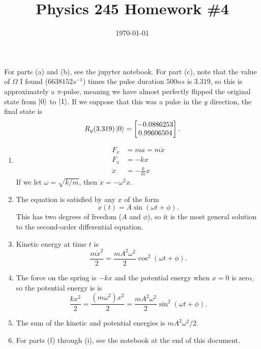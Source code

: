 \documentclass{article}
\date{\today}
\title{Physics 245 Homework \#4}
\begin{document}
\maketitle

\begin{prob}
\end{prob}
For parts (a) and (b), see the jupyter notebook. For part (c), note that the value of $\Omega$ I found ($6638152 s^{-1}$) times the pulse duration $500 ns$ is $3.319$, so this is approximately a $\pi$-pulse, meaning we have almost perfectly flipped the original state from $\left\lvert 0 \right\rangle$ to $\left\lvert 1 \right\rangle$. If we suppose that this was a pulse in the $y$ direction, the final state is
\[ R_y(3.319) \left\lvert 0 \right\rangle = \begin{bmatrix}
    -0.0886253 \\
    0.99606504
\end{bmatrix}. \]

\begin{prob}
\end{prob}
\begin{enumerate}[label=(\alph*)]
    \item \begin{align*}
            F_x &= ma = m \ddot{x} \\
            F_x &= -kx \\
            \ddot{x} &= - \frac{k}{m} x
    \end{align*}
    If we let $\omega = \sqrt{k/m}$, then $\ddot{x}=-\omega^2 x$.
\item The equation is satisfied by any $x$ of the form
    \[ x(t) = A \sin \left( \omega t + \phi \right). \]
    This has two degrees of freedom ($A$ and $\phi$), so it is the most general solution to the second-order differential equation.
\item Kinetic energy at time $t$ is
    \[ \frac{m\dot{x}^2}{2} = \frac{mA^2\omega^2}{2} \cos^2 \left( \omega t + \phi \right). \]
\item The force on the spring is $-kx$ and the potential energy when $x=0$ is zero, so the potential energy is is
    \[ \frac{kx^2}{2} = \frac{(m\omega^2)x^2}{2} = \frac{mA^2\omega^2}{2} \sin^2 \left( \omega t + \phi \right). \]
    \item The sum of the kinetic and potential energies is $mA^2\omega^2/2$.
    \item For parts (f) through (i), see the notebook at the end of this document.
\end{enumerate}
\end{document}

